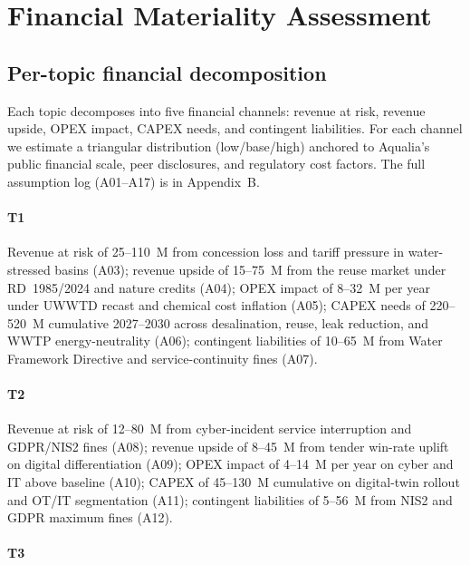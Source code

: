\documentclass[11pt, a4paper, twoside, openright]{scrreprt}
\newcommand{\euro}{\texteuro}
\begin{document}
\chapter{Financial Materiality Assessment}
\label{chap:financial}

\section{Per-topic financial decomposition}
\label{sec:perfin}

Each topic decomposes into five financial channels: revenue at risk, revenue upside, OPEX impact, CAPEX needs, and contingent liabilities. For each channel we estimate a triangular distribution (low/base/high) anchored to Aqualia's public financial scale, peer disclosures, and regulatory cost factors. The full assumption log (A01--A17) is in Appendix~B.

\subsubsection{T1}

Revenue at risk of \euro{}25--110~M from concession loss and tariff pressure in water-stressed basins (A03); revenue upside of \euro{}15--75~M from the reuse market under RD~1985/2024 and nature credits (A04); OPEX impact of \euro{}8--32~M per year under UWWTD recast and chemical cost inflation (A05); CAPEX needs of \euro{}220--520~M cumulative 2027--2030 across desalination, reuse, leak reduction, and WWTP energy-neutrality (A06); contingent liabilities of \euro{}10--65~M from Water Framework Directive and service-continuity fines (A07).

\subsubsection{T2}

Revenue at risk of \euro{}12--80~M from cyber-incident service interruption and GDPR/NIS2 fines (A08); revenue upside of \euro{}8--45~M from tender win-rate uplift on digital differentiation (A09); OPEX impact of \euro{}4--14~M per year on cyber and IT above baseline (A10); CAPEX of \euro{}45--130~M cumulative on digital-twin rollout and OT/IT segmentation (A11); contingent liabilities of \euro{}5--56~M from NIS2 and GDPR maximum fines (A12).

\subsubsection{T3}
\end{document}
